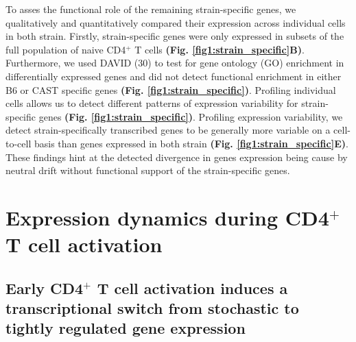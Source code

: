 To asses the functional role of the remaining strain-specific genes, we qualitatively and quantitatively compared their expression across individual cells in both strain. Firstly, strain-specific genes were only expressed in subsets of the full population of naive CD4$^+$ T cells \textbf{(Fig. \ref{fig1:strain_specific}B)}. Furthermore, we used DAVID (30) to test for gene ontology (GO) enrichment in differentially expressed genes and did not detect functional enrichment in either B6 or CAST specific genes \textbf{(Fig. \ref{fig1:strain_specific})}. Profiling individual cells allows us to detect different patterns of expression variability for strain-specific genes \textbf{(Fig. \ref{fig1:strain_specific})}. Profiling expression variability, we detect strain-specifically transcribed genes to be generally more variable on a cell-to-cell basis than genes expressed in both strain \textbf{(Fig. \ref{fig1:strain_specific}E)}. These findings hint at the detected divergence in genes expression being cause by neutral drift without functional support of the strain-specific genes.

\section{Expression dynamics during CD4$^+$ T cell activation}
\subsection*{Early CD4$^+$ T cell activation induces a transcriptional switch from stochastic to tightly regulated gene expression} \label{sec1:Tcell_activation}

